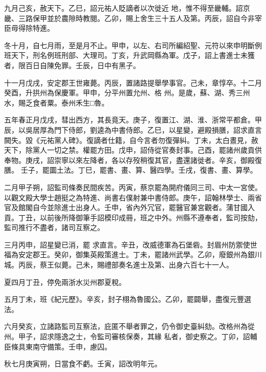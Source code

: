 \begin{pinyinscope}
 九月己亥，赦天下。乙巳，詔元祐人貶謫者以次徙近
 地，惟不得至畿輔。詔京畿、三路保甲並於農隙時教閱。乙卯，賜上舍生三十五人及第。丙辰，詔自今非宰臣毋得除特進。



 冬十月，自七月雨，至是月不止。甲申，以左、右司所編紹聖、元符以來申明斷例班天下，刑名例班刑部、大理司。丁亥，升武岡縣為軍。戊子，詔上書進士未獲者，限百日自陳免罪。壬辰，日中有黑子。



 十一月戊戌，安定郡王世雍薨。丙辰，置諸路提舉學事官。己未，章惇卒。十二月癸酉，升拱州為保慶軍。甲申，分平州置允州、格
 州。是歲，蘇、湖、秀三州水，賜乏食者粟。泰州禾生□魯。



 五年春正月戊戌，彗出西方，其長竟天。庚子，復置江、湖、淮、浙常平都倉。甲辰，以吳居厚為門下侍郎，劉逵為中書侍郎。乙巳，以星變，避殿損膳，詔求直言闕失。毀《元祐黨人碑》。復謫者仕籍，自今言者勿復彈糾。丁未，太白晝見，赦天下，除黨人一切之禁。權罷方田。戊申，詔侍從官奏封事。己酉，罷諸州歲貢供奉物。庚戌，詔崇寧以來左降者，各以存歿稍復其官，盡還諸徙者。辛亥，御殿復膳。
 壬子，罷圜土法。丁巳，罷書、畫、算、醫四學。壬戌，復書、畫、算學。



 二月甲子朔，詔監司條奏民間疾苦。丙寅，蔡京罷為開府儀同三司、中太一宮使。以觀文殿大學士趙挺之為特進、尚書右僕射兼中書侍郎。庚午，詔翰林學士、兩省官及館閣自今並除進士出身人。壬申，省內外冗官，罷醫官兼宮觀者。蒲甘國入貢。丁丑，以前後所降御筆手詔模印成冊，班之中外。州縣不遵奉者，監司按劾，監司推行不盡者，諸司互察之。



 三月丙申，詔星變已消，罷
 求直言。辛丑，改威德軍為石堡砦。封眉州防禦使世福為安定郡王。癸卯，御集英殿策進士。丁未，罷諸州武學。乙卯，廢銀州為銀川城。丙辰，蔡王似薨。己未，賜禮部奏名進士及第、出身六百七十一人。



 夏四月丁丑，停免兩浙水災州郡夏稅。



 五月丁未，班《紀元歷》。辛亥，封子栩為魯國公。乙卯，罷闢舉，盡復元豐選法。



 六月癸亥，立諸路監司互察法，庇匿不舉者罪之，仍令御史臺糾劾。改格州為從州。甲子，詔求隱逸之士，令監司審核保奏，其緣
 私者，御史察之。丁卯，詔輔臣條具東南守備策。壬申，慮囚。



 秋七月庚寅朔，日當食不虧。壬寅，詔改明年元。




\end{pinyinscope}
